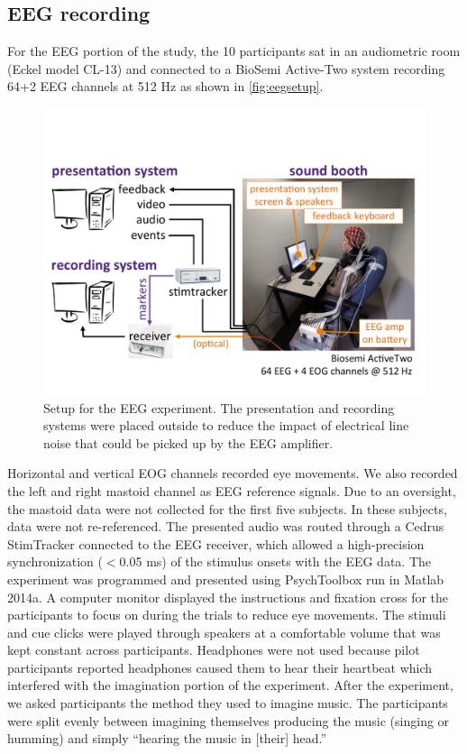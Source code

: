\subsection{EEG recording}
For the EEG portion of the study, the 10 participants sat in an audiometric room (Eckel model CL-13) and connected to a BioSemi Active-Two system recording 64+2 EEG channels at 512 Hz as shown in \autoref{fig:eegsetup}.
\begin{figure}[htb]
  \begin{center}
    \includegraphics[scale=0.48]{Figures/EEG-setup.pdf}
    \caption{%
Setup for the EEG experiment.
The presentation and recording systems were placed outside to reduce the impact of electrical line noise that could be picked up by the EEG amplifier.
}
    \label{fig:eegsetup}
  \end{center}
\end{figure}
Horizontal and vertical EOG channels recorded eye movements. 
We also recorded the left and right mastoid channel as EEG reference signals. 
Due to an oversight, the mastoid data were not collected for the first five subjects.
In these subjects, data were not re-referenced.
The presented audio %
was routed through a Cedrus StimTracker connected to the EEG receiver, which allowed a high-precision synchronization ($<$0.05 ms) of the stimulus onsets with the \ac{EEG} data.
The experiment was programmed and presented using PsychToolbox run in Matlab 2014a. 
A computer monitor displayed the instructions and fixation cross for the participants to focus on during the trials to reduce eye movements.
The stimuli and cue clicks were played through speakers at a comfortable volume that was kept constant across participants. Headphones were not used because pilot participants reported headphones caused them to hear their heartbeat which interfered with the imagination portion of the experiment. 
After the experiment, we asked participants the method they used to imagine music. 
The participants were split evenly between imagining themselves producing the music (singing or humming) and simply ``hearing the music in [their] head.'' 

